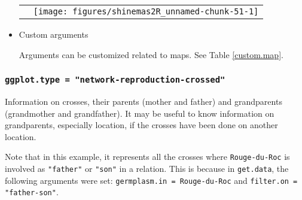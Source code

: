 \documentclass{article}\usepackage[]{graphicx}\usepackage[]{color}
\newenvironment{knitrout}{}{} %
\begin{document}
\begin{itemize}
\begin{center}
\begin{tabular}{cc}
\begin{knitrout}
{}



\end{knitrout}
&
\begin{knitrout}
\definecolor{shadecolor}{rgb}{0.969, 0.969, 0.969}\color{fgcolor}

{\centering \texttt{[image: figures/shinemas2R\_unnamed-chunk-51-1]} 

}



\end{knitrout}
\\
\end{tabular}
\end{center}


\item Custom arguments

Arguments can be customized related to maps. See Table \ref{custom.map}.

\end{itemize}


\subsubsection{\texttt{ggplot.type = "network-reproduction-crossed"}}

Information on crosses, their parents (mother and father) and grandparents (grandmother and grandfather).
It may be useful to know information on grandparents, especially location, if the crosses have been done on another location.

Note that in this example, it represents all the crosses where \texttt{Rouge-du-Roc} is involved as \texttt{"father"} or \texttt{"son"} in a relation.
This is because in \texttt{get.data}, the following arguments were set: \texttt{germplasm.in = Rouge-du-Roc} and \texttt{filter.on = "father-son"}.
\end{document}
